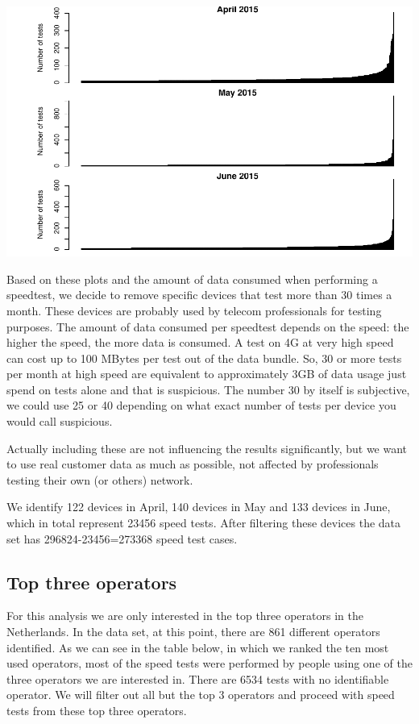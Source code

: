 \documentclass[]{article}
\begin{document}
\includegraphics{speedtest-analysis_files/figure-latex/freq-plot-devices-1.pdf}

Based on these plots and the amount of data consumed when performing a
speedtest, we decide to remove specific devices that test more than 30
times a month. These devices are probably used by telecom professionals
for testing purposes. The amount of data consumed per speedtest depends
on the speed: the higher the speed, the more data is consumed. A test on
4G at very high speed can cost up to 100 MBytes per test out of the data
bundle. So, 30 or more tests per month at high speed are equivalent to
approximately 3GB of data usage just spend on tests alone and that is
suspicious. The number 30 by itself is subjective, we could use 25 or 40
depending on what exact number of tests per device you would call
suspicious.

Actually including these are not influencing the results significantly,
but we want to use real customer data as much as possible, not affected
by professionals testing their own (or others) network.

We identify 122 devices in April, 140 devices in May and 133 devices in
June, which in total represent 23456 speed tests. After filtering these
devices the data set has 296824-23456=273368 speed test cases.

\subsection{Top three operators}\label{top-three-operators}

For this analysis we are only interested in the top three operators in
the Netherlands. In the data set, at this point, there are 861 different
operators identified. As we can see in the table below, in which we
ranked the ten most used operators, most of the speed tests were
performed by people using one of the three operators we are interested
in. There are 6534 tests with no identifiable operator. We will filter
out all but the top 3 operators and proceed with speed tests from these
top three operators.
\end{document}
